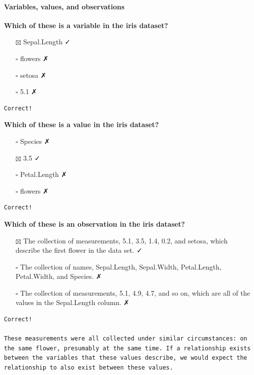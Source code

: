 \documentclass[
]{article}
\providecommand{\tightlist}{%
  \setlength{\itemsep}{0pt}\setlength{\parskip}{0pt}}
\begin{document}
\hypertarget{variables-values-and-observations}{%
\paragraph{Variables, values, and
observations}\label{variables-values-and-observations}}

\textbf{Which of these is a variable in the iris dataset?}

\begin{itemize}
\tightlist
\item[$\boxtimes$]
  Sepal.Length ✓
\item[$\square$]
  flowers ✗
\item[$\square$]
  setosa ✗
\item[$\square$]
  5.1 ✗
\end{itemize}

\begin{verbatim}
Correct!
\end{verbatim}

\textbf{Which of these is a value in the iris dataset?}

\begin{itemize}
\tightlist
\item[$\square$]
  Species ✗
\item[$\boxtimes$]
  3.5 ✓
\item[$\square$]
  Petal.Length ✗
\item[$\square$]
  flowers ✗
\end{itemize}

\begin{verbatim}
Correct!
\end{verbatim}

\textbf{Which of these is an observation in the iris dataset?}

\begin{itemize}
\tightlist
\item[$\boxtimes$]
  The collection of measurements, 5.1, 3.5, 1.4, 0.2, and setosa, which
  describe the first flower in the data set. ✓
\item[$\square$]
  The collection of names, Sepal.Length, Sepal.Width, Petal.Length,
  Petal.Width, and Species. ✗
\item[$\square$]
  The collection of measurements, 5.1, 4.9, 4.7, and so on, which are
  all of the values in the Sepal.Length column. ✗
\end{itemize}

\begin{verbatim}
Correct!

These measurements were all collected under similar circumstances: on the same flower, presumably at the same time. If a relationship exists between the variables that these values describe, we would expect the relationship to also exist between these values.
\end{verbatim}
\end{document}
